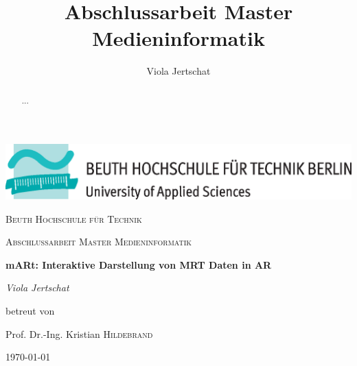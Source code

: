 \documentclass[a4paper,11pt]{report}
\title{Abschlussarbeit Master Medieninformatik}
\author{Viola Jertschat}
\begin{document}
\begin{titlepage}
	\centering
	\includegraphics[width=\textwidth]{images/beuthlogo.eps}\par\vspace{1cm}
	{\scshape\LARGE Beuth Hochschule für Technik \par}
	\vspace{1cm}
	{\scshape\Large Abschlussarbeit Master Medieninformatik\par}
	\vspace{1.5cm}
	{\huge\bfseries mARt: Interaktive Darstellung von MRT Daten in AR\par}
	\vspace{2cm}
	{\Large\itshape Viola Jertschat\par}
	\vfill
	betreut von\par
	Prof. Dr.-Ing. Kristian \textsc{Hildebrand}

	\vfill

	{\large \today\par}
\end{titlepage}

\begin{abstract} 
...
\end{abstract}

\tableofcontents

\listoffigures

\printglossaries











\pagebreak

\printbibliography
\end{document}
